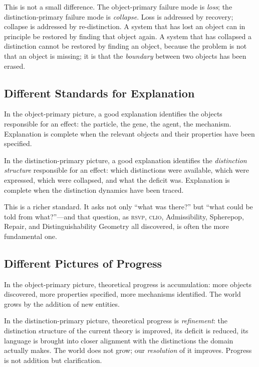 \documentclass[12pt, letterpaper]{article}
\theoremstyle{remark}
\newcommand{\rsvp}{\textsc{rsvp}}
\newcommand{\clio}{\textsc{clio}}
\begin{document}
This is not a small difference.  The object-primary failure mode is
\emph{loss}; the distinction-primary failure mode is \emph{collapse}.
Loss is addressed by recovery; collapse is addressed by re-distinction.
A system that has lost an object can in principle be restored by finding
that object again.  A system that has collapsed a distinction cannot be
restored by finding an object, because the problem is not that an object
is missing; it is that the \emph{boundary} between two objects has been
erased.

\subsection{Different Standards for Explanation}

In the object-primary picture, a good explanation identifies the objects
responsible for an effect: the particle, the gene, the agent, the mechanism.
Explanation is complete when the relevant objects and their properties have
been specified.

In the distinction-primary picture, a good explanation identifies the
\emph{distinction structure} responsible for an effect: which distinctions
were available, which were expressed, which were collapsed, and what
the deficit was.  Explanation is complete when the distinction dynamics
have been traced.

This is a richer standard.  It asks not only ``what was there?'' but
``what could be told from what?''---and that question, as \rsvp{}, \clio{},
Admissibility, Spherepop, Repair, and Distinguishability Geometry all
discovered, is often the more fundamental one.

\subsection{Different Pictures of Progress}

In the object-primary picture, theoretical progress is accumulation: more
objects discovered, more properties specified, more mechanisms identified.
The world grows by the addition of new entities.

In the distinction-primary picture, theoretical progress is
\emph{refinement}: the distinction structure of the current theory is
improved, its deficit is reduced, its language is brought into closer
alignment with the distinctions the domain actually makes.  The world does
not grow; our \emph{resolution} of it improves.  Progress is not addition
but clarification.
\end{document}
